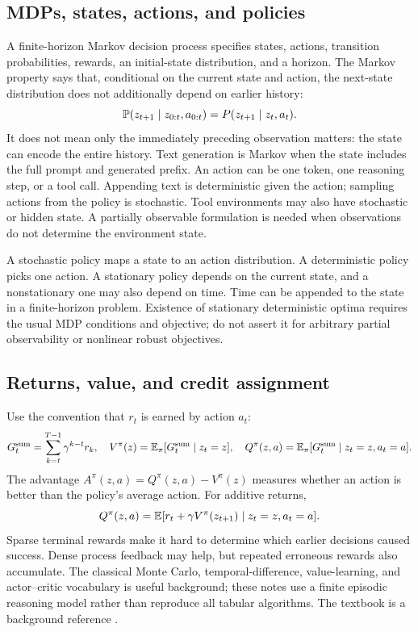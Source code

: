 \subsection{MDPs, states, actions, and policies}
A finite-horizon Markov decision process specifies states, actions, transition
probabilities, rewards, an initial-state distribution, and a horizon. The Markov
property says that, conditional on the current state and action, the next-state
distribution does not additionally depend on earlier history:
\[
 \mathbb{P}(z_{t+1}\mid z_{0:t},a_{0:t})
 =P(z_{t+1}\mid z_t,a_t).
\]
It does not mean only the immediately preceding observation matters: the state
can encode the entire history. Text generation is Markov when the state includes
the full prompt and generated prefix. An action can be one token, one reasoning
step, or a tool call. Appending text is deterministic given the action; sampling
actions from the policy is stochastic. Tool environments may also have stochastic
or hidden state. A partially observable formulation is needed when observations
do not determine the environment state.

A stochastic policy maps a state to an action distribution. A deterministic
policy picks one action. A stationary policy depends on the current state, and
a nonstationary one may also depend on time. Time can be appended to the state
in a finite-horizon problem. Existence of stationary deterministic optima requires
the usual MDP conditions and objective; do not assert it for arbitrary partial
observability or nonlinear robust objectives.

\subsection{Returns, value, and credit assignment}
Use the convention that $r_t$ is earned by action $a_t$:
\[
 G_t^{\mathrm{sum}}=\sum_{k=t}^{T-1}\gamma^{k-t}r_k,
 \quad V^\pi(z)=\mathbb{E}_\pi[G_t^{\mathrm{sum}}\mid z_t=z],
 \quad Q^\pi(z,a)=\mathbb{E}_\pi[G_t^{\mathrm{sum}}\mid z_t=z,a_t=a].
\]
The advantage $A^\pi(z,a)=Q^\pi(z,a)-V^\pi(z)$ measures whether an action is
better than the policy's average action. For additive returns,
\[
 Q^\pi(z,a)=\mathbb{E}[r_t+\gamma V^\pi(z_{t+1})\mid z_t=z,a_t=a].
\]
Sparse terminal rewards make it hard to determine which earlier decisions
caused success. Dense process feedback may help, but repeated erroneous rewards
also accumulate. The classical Monte Carlo, temporal-difference, value-learning,
and actor--critic vocabulary is useful background; these notes use a finite
episodic reasoning model rather than reproduce all tabular algorithms. The
textbook is a background reference \cite{sutton}.

